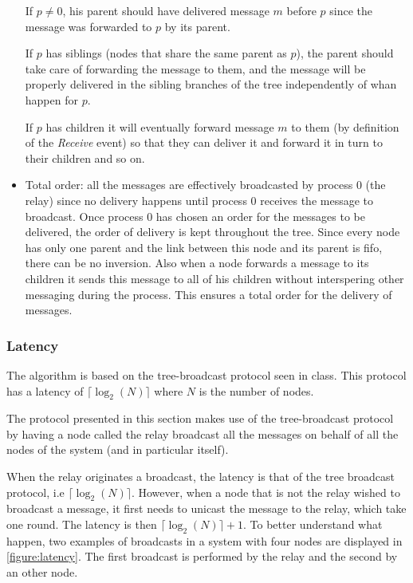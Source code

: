 \documentclass[a4paper]{article}
\begin{document}
\begin{itemize}
        If $p \neq 0$, his parent should have delivered message $m$ before
        $p$ since the message was forwarded to $p$ by its parent.

        If $p$ has siblings (nodes that share the same parent as $p$), the
        parent should take care of forwarding the message to them, and the
        message will be properly delivered in the sibling branches of the
        tree independently of whan happen for $p$.

        If $p$ has children it will eventually forward message $m$ to them
        (by definition of the \textit{Receive} event) so that they can
        deliver it and forward it in turn to their children and so on.
    \item Total order: all the messages are effectively broadcasted by process
        $0$ (the relay) since no delivery happens until process $0$ receives
        the message to broadcast. Once process $0$ has chosen an order for the
        messages to be delivered, the order of delivery is kept throughout the
        tree. Since every node has only one parent and the link between this
        node and its parent is fifo, there can be no inversion. Also when a
        node forwards a message to its children it sends this message to all
        of his children without interspering other messaging during the
        process. This ensures a total order for the delivery of messages.
\end{itemize}

\subsubsection*{Latency}
The algorithm is based on the tree-broadcast protocol seen in class. This
protocol has a latency of $\lceil\log_2(N)\rceil$ where $N$ is the number of
nodes.

The protocol presented in this section makes use of the tree-broadcast
protocol by having a node called the relay broadcast all the messages on
behalf of all the nodes of the system (and in particular itself).

When the relay originates a broadcast, the latency is that of the tree
broadcast protocol, i.e $\lceil\log_2(N)\rceil$. However, when a node that is
not the relay wished to broadcast a message, it first needs to unicast the
message to the relay, which take one round. The latency is then
$\lceil\log_2(N)\rceil + 1$. To better understand what happen, two examples
of broadcasts in a system with four nodes are displayed in
\ref{figure:latency}. The first broadcast is performed by the relay and the
second by an other node.
\end{document}
